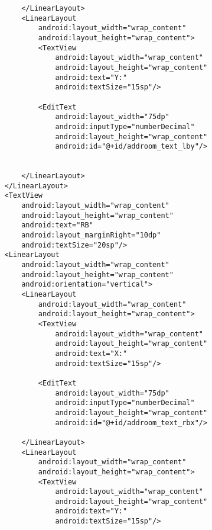 \begin{lstlisting}
                    </LinearLayout>
                    <LinearLayout
                        android:layout_width="wrap_content"
                        android:layout_height="wrap_content">
                        <TextView
                            android:layout_width="wrap_content"
                            android:layout_height="wrap_content"
                            android:text="Y:"
                            android:textSize="15sp"/>

                        <EditText
                            android:layout_width="75dp"
                            android:inputType="numberDecimal"
                            android:layout_height="wrap_content"
                            android:id="@+id/addroom_text_lby"/>


                    </LinearLayout>
                </LinearLayout>
                <TextView
                    android:layout_width="wrap_content"
                    android:layout_height="wrap_content"
                    android:text="RB"
                    android:layout_marginRight="10dp"
                    android:textSize="20sp"/>
                <LinearLayout
                    android:layout_width="wrap_content"
                    android:layout_height="wrap_content"
                    android:orientation="vertical">
                    <LinearLayout
                        android:layout_width="wrap_content"
                        android:layout_height="wrap_content">
                        <TextView
                            android:layout_width="wrap_content"
                            android:layout_height="wrap_content"
                            android:text="X:"
                            android:textSize="15sp"/>

                        <EditText
                            android:layout_width="75dp"
                            android:inputType="numberDecimal"
                            android:layout_height="wrap_content"
                            android:id="@+id/addroom_text_rbx"/>

                    </LinearLayout>
                    <LinearLayout
                        android:layout_width="wrap_content"
                        android:layout_height="wrap_content">
                        <TextView
                            android:layout_width="wrap_content"
                            android:layout_height="wrap_content"
                            android:text="Y:"
                            android:textSize="15sp"/>


\end{lstlisting}
